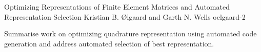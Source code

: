               {Optimizing Representations of Finite Element Matrices and 
               Automated Representation Selection}
              {Kristian B. {\O}lgaard and Garth N. Wells}
              {oelgaard-2}

Summarise work on optimizing quadrature representation using automated code
generation and address automated selection of best representation. 
